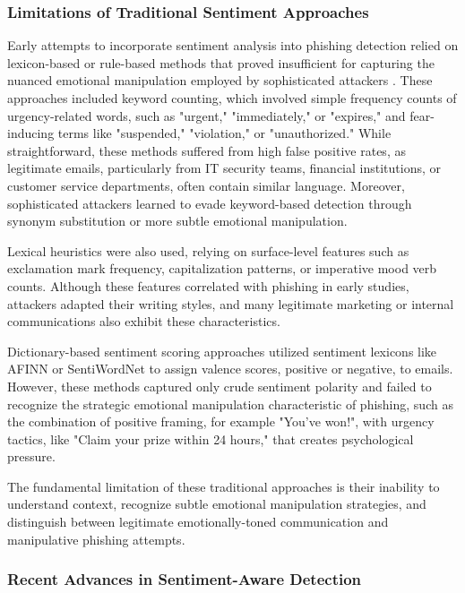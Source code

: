 \subsubsection{Limitations of Traditional Sentiment Approaches}


Early attempts to incorporate sentiment analysis into phishing detection relied on lexicon-based or rule-based methods that proved insufficient for capturing the nuanced emotional manipulation employed by sophisticated attackers \cite{liu2012sentiment}. These approaches included keyword counting, which involved simple frequency counts of urgency-related words, such as "urgent," "immediately," or "expires," and fear-inducing terms like "suspended," "violation," or "unauthorized." While straightforward, these methods suffered from high false positive rates, as legitimate emails, particularly from IT security teams, financial institutions, or customer service departments, often contain similar language. Moreover, sophisticated attackers learned to evade keyword-based detection through synonym substitution or more subtle emotional manipulation.

Lexical heuristics were also used, relying on surface-level features such as exclamation mark frequency, capitalization patterns, or imperative mood verb counts. Although these features correlated with phishing in early studies, attackers adapted their writing styles, and many legitimate marketing or internal communications also exhibit these characteristics.

Dictionary-based sentiment scoring approaches utilized sentiment lexicons like AFINN or SentiWordNet to assign valence scores, positive or negative, to emails. However, these methods captured only crude sentiment polarity and failed to recognize the strategic emotional manipulation characteristic of phishing, such as the combination of positive framing, for example "You've won!", with urgency tactics, like "Claim your prize within 24 hours," that creates psychological pressure.

The fundamental limitation of these traditional approaches is their inability to understand context, recognize subtle emotional manipulation strategies, and distinguish between legitimate emotionally-toned communication and manipulative phishing attempts.

\subsubsection{Recent Advances in Sentiment-Aware Detection}

